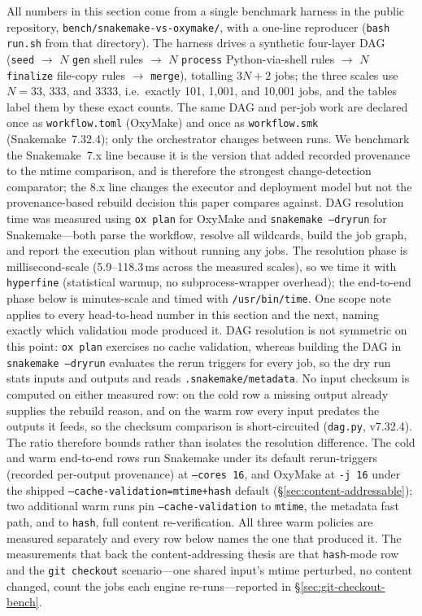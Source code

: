\documentclass[12pt,a4paper]{article}
\newcommand{\code}[1]{{\texttt{\small\color{inlinecode}#1}}}
\begin{document}
All numbers in this section come from a single benchmark harness in
the public repository,
\code{bench/\allowbreak snakemake-\allowbreak vs-\allowbreak oxymake/},
with a one-line reproducer (\code{bash run.sh} from that directory).
The harness drives a synthetic four-layer DAG
(\code{seed} $\to$ $N$ \code{gen} shell rules $\to$ $N$ \code{process}
Python-via-shell rules $\to$ $N$ \code{finalize} file-copy rules $\to$
\code{merge}), totalling $3N{+}2$ jobs; the three scales use $N{=}33$,
$333$, and $3333$, i.e.\ exactly 101, 1{,}001, and 10{,}001 jobs, and
the tables label them by these exact counts. The same DAG and per-job work are declared once
as \code{workflow.toml} (OxyMake) and once as \code{workflow.smk}
(Snakemake~7.32.4); only the orchestrator changes between runs. We
benchmark the Snakemake~7.x line because it is the version that added
recorded provenance to the mtime comparison, and is therefore the
strongest change-detection comparator; the 8.x line changes the executor
and deployment model but not the provenance-based rebuild decision this
paper compares against. DAG resolution
time was measured using \code{ox plan} for OxyMake and
\code{snakemake --dryrun} for Snakemake---both parse the workflow, resolve all
wildcards, build the job graph, and report the execution plan without running
any jobs. The resolution phase is millisecond-scale
(5.9--118.3\,ms across the measured scales), so we time it with
\code{hyperfine} (statistical warmup, no subprocess-wrapper overhead); the
end-to-end phase below is minutes-scale and timed with \code{/usr/bin/time}.
One scope note applies to every head-to-head number in this section
and the next, naming exactly which validation mode produced it. DAG
resolution is not symmetric on this point: \code{ox plan} exercises no
cache validation, whereas building the DAG in \code{snakemake --dryrun}
evaluates the rerun triggers for every job, so the dry run stats inputs
and outputs and reads \code{.snakemake/metadata}. No input checksum is
computed on either measured row: on the cold row a missing output
already supplies the rebuild reason, and on the warm row every input
predates the outputs it feeds, so the checksum comparison is
short-circuited (\code{dag.py}, v7.32.4). The ratio therefore bounds rather than
isolates the resolution difference. The cold and warm end-to-end rows run
Snakemake under its default rerun-triggers (recorded per-output
provenance) at \code{--cores 16}, and OxyMake at \code{-j 16} under
the shipped \code{--cache-validation=mtime+hash} default
(\S\ref{sec:content-addressable}); two additional warm runs pin
\code{--cache-validation} to \code{mtime}, the metadata fast path, and
to \code{hash}, full content re-verification. All three warm policies
are measured separately and every row below names the one that
produced it. The
measurements that back the content-addressing thesis are that
\code{hash}-mode row and the \code{git checkout} scenario---one shared
input's mtime perturbed, no content changed, count the jobs each engine
re-runs---reported in \S\ref{sec:git-checkout-bench}.
\end{document}
